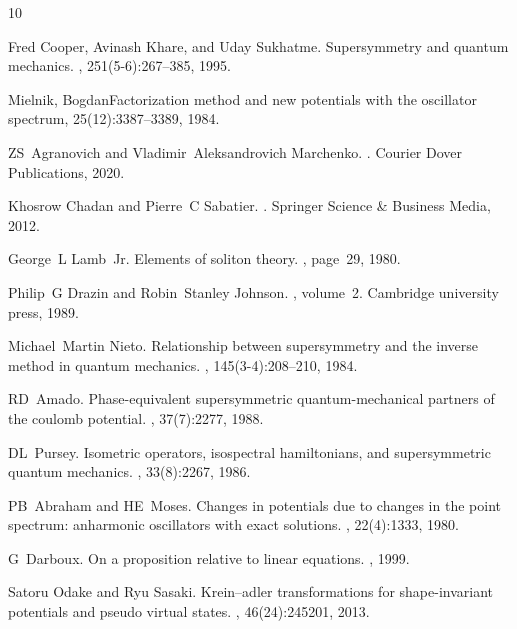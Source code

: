 \documentclass[11pt]{article}
\begin{document}
\begin{thebibliography}{10}


Fred Cooper, Avinash Khare, and Uday Sukhatme.
\newblock Supersymmetry and quantum mechanics.
, 251(5-6):267--385, 1995.

Mielnik, Bogdan\newblock Factorization method and new potentials with the oscillator spectrum, 25(12):3387--3389, 1984.

ZS~Agranovich and Vladimir~Aleksandrovich Marchenko.
.
\newblock Courier Dover Publications, 2020.

Khosrow Chadan and Pierre~C Sabatier.
.
\newblock Springer Science \& Business Media, 2012.

George~L Lamb~Jr.
\newblock Elements of soliton theory.
, page~29, 1980.

Philip~G Drazin and Robin~Stanley Johnson.
, volume~2.
\newblock Cambridge university press, 1989.

Michael~Martin Nieto.
\newblock Relationship between supersymmetry and the inverse method in quantum
  mechanics.
, 145(3-4):208--210, 1984.

RD~Amado.
\newblock Phase-equivalent supersymmetric quantum-mechanical partners of the
  coulomb potential.
, 37(7):2277, 1988.

DL~Pursey.
\newblock Isometric operators, isospectral hamiltonians, and supersymmetric
  quantum mechanics.
, 33(8):2267, 1986.

PB~Abraham and HE~Moses.
\newblock Changes in potentials due to changes in the point spectrum:
  anharmonic oscillators with exact solutions.
, 22(4):1333, 1980.

G~Darboux.
\newblock On a proposition relative to linear equations.
, 1999.

Satoru Odake and Ryu Sasaki.
\newblock Krein--adler transformations for shape-invariant potentials and
  pseudo virtual states.
,
  46(24):245201, 2013.


\end{thebibliography}
\end{document}
